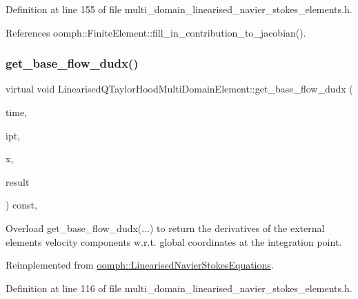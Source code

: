 Definition at line 155 of file multi\+\_\+domain\+\_\+linearised\+\_\+navier\+\_\+stokes\+\_\+elements.\+h.



References oomph\+::\+Finite\+Element\+::fill\+\_\+in\+\_\+contribution\+\_\+to\+\_\+jacobian().

\mbox{\label{classLinearisedQTaylorHoodMultiDomainElement_a6475d80b5a628ad3fbdf8ad2a354617d}} 
\subsubsection{\texorpdfstring{get\+\_\+base\+\_\+flow\+\_\+dudx()}{get\_base\_flow\_dudx()}}
{\footnotesize\ttfamily virtual void Linearised\+Q\+Taylor\+Hood\+Multi\+Domain\+Element\+::get\+\_\+base\+\_\+flow\+\_\+dudx (\begin{DoxyParamCaption}\item[{const double \&}]{time,  }\item[{const unsigned \&}]{ipt,  }\item[{const \hyperlink{classoomph_1_1Vector}{Vector}$<$ double $>$ \&}]{x,  }\item[{\hyperlink{classoomph_1_1DenseMatrix}{Dense\+Matrix}$<$ double $>$ \&}]{result }\end{DoxyParamCaption}) const\hspace{0.3cm}{\ttfamily [inline]}, {\ttfamily [virtual]}}



Overload get\+\_\+base\+\_\+flow\+\_\+dudx(...) to return the derivatives of the external element\textquotesingle{}s velocity components w.\+r.\+t. global coordinates at the integration point. 



Reimplemented from \hyperlink{classoomph_1_1LinearisedNavierStokesEquations_ab4b45c111571d3904985dcefcae8ef67}{oomph\+::\+Linearised\+Navier\+Stokes\+Equations}.



Definition at line 116 of file multi\+\_\+domain\+\_\+linearised\+\_\+navier\+\_\+stokes\+\_\+elements.\+h.



